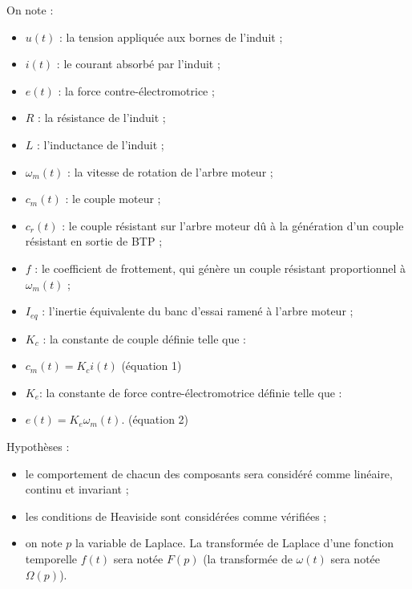 \documentclass[10pt,fleqn]{article} %
\begin{document}
\begin{multicols}{2}
On note :
\begin{itemize}
	\item $u(t)$ : la tension appliquée aux bornes de l'induit ;
	\item $i(t)$ : le courant absorbé par l'induit ;
	\item $e(t)$ : la force contre-électromotrice ;
	\item $R$ : la résistance de l'induit ;
	\item $L$ : l'inductance de l'induit ;
	\item $\omega_m (t)$ : la vitesse de rotation de l'arbre moteur ;
	\item $c_m (t)$ : le couple moteur ;
	\item $c_r (t)$ : le couple résistant sur l'arbre moteur dû à la génération d'un couple résistant en sortie de BTP ;
	\item $f$ : le coefficient de frottement, qui génère un couple résistant proportionnel à $\omega_m (t)$ ;
	\item $I_{eq}$ : l'inertie équivalente du banc d'essai ramené à l'arbre moteur ;
	\item $K_c$ : la constante de couple définie telle que :
	\item $c_m (t)=K_c i(t)$	(équation 1)
	\item $K_e$: la constante de force contre-électromotrice définie telle que :
	\item $e(t)=K_e \omega_m (t)$.	(équation 2)
	\end{itemize}
%	
Hypothèses :
\begin{itemize}
\item le comportement de chacun des composants sera considéré comme linéaire, continu et invariant ;
\item les conditions de Heaviside sont considérées comme vérifiées ;
\item on note $p$ la variable de Laplace. La transformée de Laplace d'une fonction temporelle $f(t)$ sera notée $F(p)$ (la transformée de $\omega(t)$ sera notée $\Omega(p)$).
\end{itemize}

%
%
%


\end{multicols}
\end{document}
